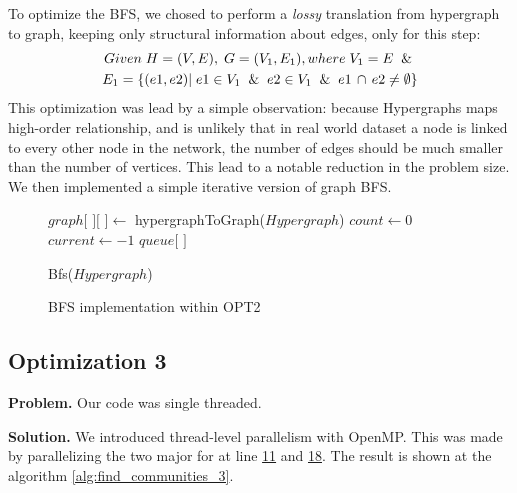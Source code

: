 \documentclass[conference]{IEEEtran}
\newcommand{\mypar}[1]{{\bf #1.}}
\begin{document}
To optimize the BFS, we chosed to perform a \textit{lossy} translation from hypergraph to graph, keeping only structural information about edges, only for this step: 
\begin{multline*}
    Given\;H=(V,E),\; G=(V_1,E_1), where\;V_1=E\And\\
    E_1=\{(e1,e2) |\; e1\in V_1 \And e2\in V_1 \And e1\,\cap\,e2\neq\emptyset\}
\end{multline*}
This optimization was lead by a simple observation: because Hypergraphs maps high-order relationship, and is unlikely that in real world dataset a node is linked to every other node in the network, the number of edges should be much smaller than the number of vertices. This lead to a notable reduction in the problem size. We then implemented a simple iterative version of graph BFS.

\begin{figure}[H]
    \begin{algorithm}[H]
    \SetAlgoLined
        $graph[$ $][$ $] \gets $ hypergraphToGraph($Hypergraph$)\;
        $count \gets 0$\;
        $current \gets -1$\;
        $queue[$ $]$\;
    \caption{Bfs($Hypergraph$)}
    \end{algorithm}
    \caption{BFS implementation within OPT2}
\end{figure}

\subsection{Optimization 3}
\mypar{Problem}
Our code was single threaded.

\mypar{Solution}
We introduced thread-level parallelism with OpenMP.  
This was made by parallelizing the two major for at line \hyperref[alg:find_communities]{11} and \hyperref[alg:find_communities]{18}. The result is shown at the algorithm \ref{alg:find_communities_3}.
\end{document}
